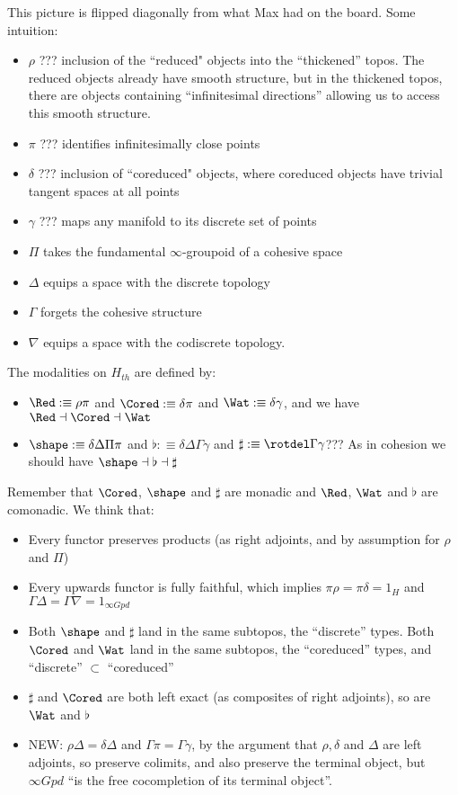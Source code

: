 \documentclass[a4paper,12pt]{article}
\begin{document}
This picture is flipped diagonally from what Max had on the board. Some intuition:
\begin{itemize}
\item $\rho$ ??? inclusion of the ``reduced" objects into the ``thickened'' topos.  The reduced objects already have smooth structure, but in the thickened topos, there are objects containing ``infinitesimal directions'' allowing us to access this smooth structure.
\item $\pi$ ??? identifies infinitesimally close points
\item $\delta$ ??? inclusion of ``coreduced" objects, where coreduced objects have trivial tangent spaces at all points
\item $\gamma$ ??? maps any manifold to its discrete set of points
\item $\Pi$ takes the fundamental $\infty$-groupoid of a cohesive space
\item $\Delta$ equips a space with the discrete topology
\item $\Gamma$ forgets the cohesive structure
\item $\nabla$ equips a space with the codiscrete topology.
\end{itemize}
The modalities on $H_{th}$ are defined by:
\begin{itemize}
\item $\Red :\equiv \rho\pi$ and $\Cored :\equiv \delta\pi$ and $\Wat :\equiv \delta\gamma$, and we have $\Red \dashv \Cored \dashv \Wat$
\item $\shape :\equiv \delta \Delta \Pi \pi$ and $\flat :\equiv \delta \Delta \Gamma \gamma$ and $\sharp :\equiv \rotdel \Gamma \gamma$??? As in cohesion we should have $\shape \dashv \flat \dashv \sharp$
\end{itemize}
Remember that $\Cored$, $\shape$ and $\sharp$ are monadic and $\Red$, $\Wat$ and $\flat$ are comonadic. We think that:
\begin{itemize}
\item Every functor preserves products (as right adjoints, and by assumption for $\rho$ and $\Pi$)
\item Every upwards functor is fully faithful, which implies $\pi\rho = \pi\delta = 1_H$ and $\Gamma\Delta = \Gamma\nabla = 1_{\infty Gpd}$
\item Both $\shape$ and $\sharp$ land in the same subtopos, the ``discrete'' types. Both $\Cored$ and $\Wat$ land in the same subtopos, the ``coreduced'' types, and ``discrete'' $\subset$ ``coreduced''
\item $\sharp$ and $\Cored$ are both left exact (as composites of right adjoints), so are $\Wat$ and $\flat$
\item NEW: $\rho \Delta = \delta \Delta$ and $\Gamma\pi = \Gamma\gamma$, by the argument that $\rho, \delta$ and $\Delta$ are left adjoints, so preserve colimits, and also preserve the terminal object, but $\infty Gpd$ ``is the free cocompletion of its terminal object''.
\end{itemize} 
\end{document}
